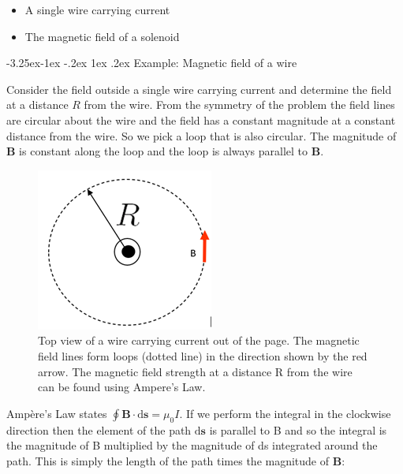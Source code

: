\documentclass[
]{book}
\makeatletter
\renewcommand\subsection{%
\@startsection{subsection}{2}{\z@}%
              {-3.25ex\@plus -1ex \@minus -.2ex}%
              {1ex \@plus .2ex}%
              {\sffamily\bfseries}}
\numberwithin{equation}{section}
\makeatother
\begin{document}
\begin{itemize}
\item
  A single wire carrying current
\item
  The magnetic field of a solenoid
\end{itemize}

\hypertarget{example-magnetic-field-of-a-wire}{%
\subsection{Example: Magnetic field of a wire}\label{example-magnetic-field-of-a-wire}}

Consider the field outside a single wire carrying current and determine
the field at a distance \(R\) from the wire. From the symmetry of the
problem the field lines are circular about the wire and the field has a
constant magnitude at a constant distance from the wire. So we pick a
loop that is also circular. The magnitude of \(\mathbf{B}\) is constant along the
loop and the loop is always parallel to \(\mathbf{B}\).

\begin{figure}

{\centering \includegraphics[width=0.7\linewidth]{Figures/wireField} 

}

\caption{Top view of a wire carrying current out of the page. The magnetic field lines form loops (dotted line) in the direction shown by the red arrow. The magnetic field strength at a distance R from the wire can be found using Ampere's Law.}\label{fig:wireField}
\end{figure}

Ampère's Law states \(\oint \mathbf{B} \cdot \mathrm{d}\mathbf{s} = \mu_0 I\). If we perform the
integral in the clockwise direction then the element of the path \(\mathrm{d}\mathbf{s}\)
is parallel to B and so the integral is the magnitude of B multiplied by
the magnitude of ds integrated around the path. This is simply the
length of the path times the magnitude of \(\mathbf{B}\):
\end{document}
